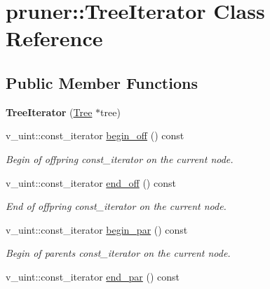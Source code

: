 \hypertarget{classpruner_1_1TreeIterator}{}\section{pruner\+:\+:Tree\+Iterator Class Reference}
\label{classpruner_1_1TreeIterator}
\subsection*{Public Member Functions}
\begin{DoxyCompactItemize}
\item 
{\bfseries Tree\+Iterator} (\hyperlink{classpruner_1_1Tree}{Tree} $\ast$tree)\hypertarget{classpruner_1_1TreeIterator_a743f2a767abbac4da1fcc5b4029b94f2}{}\label{classpruner_1_1TreeIterator_a743f2a767abbac4da1fcc5b4029b94f2}

\item 
v\+\_\+uint\+::const\+\_\+iterator \hyperlink{classpruner_1_1TreeIterator_a5489e283acdd398f614a25d14448a8f3}{begin\+\_\+off} () const \hypertarget{classpruner_1_1TreeIterator_a5489e283acdd398f614a25d14448a8f3}{}\label{classpruner_1_1TreeIterator_a5489e283acdd398f614a25d14448a8f3}

\begin{DoxyCompactList}\small\item\em Begin of offpring {\ttfamily const\+\_\+iterator} on the current node. \end{DoxyCompactList}\item 
v\+\_\+uint\+::const\+\_\+iterator \hyperlink{classpruner_1_1TreeIterator_a9f9df3d3c75c8d16f5d1768a6675a41d}{end\+\_\+off} () const \hypertarget{classpruner_1_1TreeIterator_a9f9df3d3c75c8d16f5d1768a6675a41d}{}\label{classpruner_1_1TreeIterator_a9f9df3d3c75c8d16f5d1768a6675a41d}

\begin{DoxyCompactList}\small\item\em End of offpring {\ttfamily const\+\_\+iterator} on the current node. \end{DoxyCompactList}\item 
v\+\_\+uint\+::const\+\_\+iterator \hyperlink{classpruner_1_1TreeIterator_a3cb8dd28630f065472e135f7db822abf}{begin\+\_\+par} () const \hypertarget{classpruner_1_1TreeIterator_a3cb8dd28630f065472e135f7db822abf}{}\label{classpruner_1_1TreeIterator_a3cb8dd28630f065472e135f7db822abf}

\begin{DoxyCompactList}\small\item\em Begin of parents {\ttfamily const\+\_\+iterator} on the current node. \end{DoxyCompactList}\item 
v\+\_\+uint\+::const\+\_\+iterator \hyperlink{classpruner_1_1TreeIterator_aac5656fc5b550cb8dfa4a9ebd5ea910a}{end\+\_\+par} () const \hypertarget{classpruner_1_1TreeIterator_aac5656fc5b550cb8dfa4a9ebd5ea910a}{}\label{classpruner_1_1TreeIterator_aac5656fc5b550cb8dfa4a9ebd5ea910a}


\end{DoxyCompactItemize}
